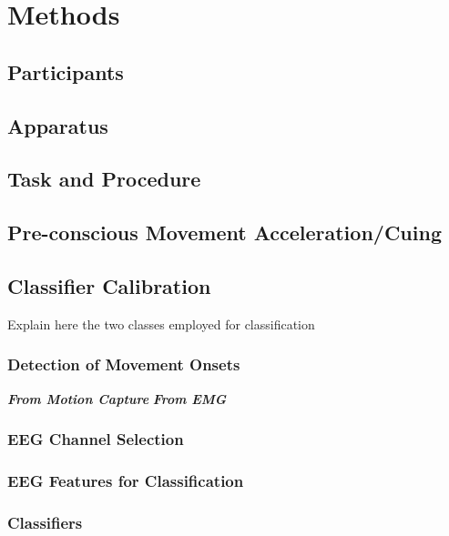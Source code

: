 \section{Methods}

\subsection{Participants}

\subsection{Apparatus}

\subsection{Task and Procedure}

\subsection{Pre-conscious Movement Acceleration/Cuing}

\subsection{Classifier Calibration}
Explain here the two classes employed for classification

\subsubsection{Detection of Movement Onsets}

\indent \textit{\textbf{From Motion Capture}}
\indent \textit{\textbf{From EMG}}

\subsubsection{EEG Channel Selection}

\subsubsection{EEG Features for Classification}

\subsubsection{Classifiers}